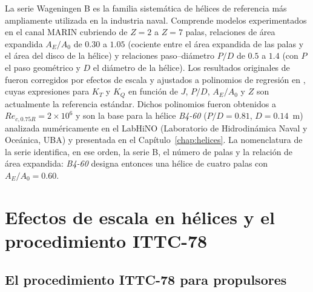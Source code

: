 La serie Wageningen B es la familia sistemática de hélices de referencia más ampliamente utilizada en la industria naval. Comprende modelos experimentados en el canal MARIN cubriendo de $Z = 2$ a $Z = 7$ palas, relaciones de área expandida $A_E/A_0$ de $0.30$ a $1.05$ (cociente entre el área expandida de las palas y el área del disco de la hélice) y relaciones paso--diámetro $P/D$ de $0.5$ a $1.4$ (con $P$ el paso geométrico y $D$ el diámetro de la hélice). Los resultados originales de \citet{troost1940} fueron corregidos por efectos de escala y ajustados a polinomios de regresión en \citet{oosterveld1975}, cuyas expresiones para $K_T$ y $K_Q$ en función de $J$, $P/D$, $A_E/A_0$ y $Z$ son actualmente la referencia estándar. Dichos polinomios fueron obtenidos a $Re_{c,0.75R} = 2\times10^6$ y son la base para la hélice \textit{B4-60} ($P/D = 0.81$, $D = 0.14$~m) analizada numéricamente en el LabHiNO (Laboratorio de Hidrodinámica Naval y Oceánica, UBA) y presentada en el Capítulo~\ref{chap:helices}. La nomenclatura de la serie identifica, en ese orden, la serie B, el número de palas y la relación de área expandida: \textit{B4-60} designa entonces una hélice de cuatro palas con $A_E/A_0 = 0.60$.
 
\section{Efectos de escala en hélices y el procedimiento ITTC-78}
\label{sec:escala_helices}
 
\subsection{El procedimiento ITTC-78 para propulsores}
\label{sec:ittc78_propulsor}
 
